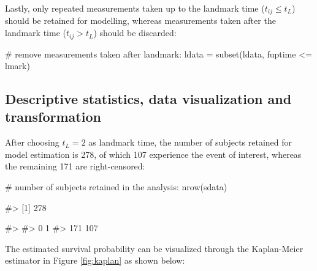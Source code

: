 Lastly, only repeated measurements taken up to the landmark time
(\(t_{ij} \leq t_L\)) should be retained for modelling, whereas
measurements taken after the landmark time (\(t_{ij} > t_L\)) should be
discarded:

\begin{Schunk}
\begin{Sinput}
# remove measurements taken after landmark:
ldata = subset(ldata, fuptime <= lmark)
\end{Sinput}
\end{Schunk}

\subsection{Descriptive statistics, data visualization and
transformation}\label{descriptive-statistics-data-visualization-and-transformation}

After choosing \(t_L = 2\) as landmark time, the number of subjects
retained for model estimation is 278, of which 107 experience the event
of interest, whereas the remaining 171 are right-censored:

\begin{Schunk}
\begin{Sinput}
# number of subjects retained in the analysis:
nrow(sdata)
\end{Sinput}
\begin{Soutput}
#> [1] 278
\end{Soutput}
\begin{Soutput}
#> 
#>   0   1 
#> 171 107
\end{Soutput}
\end{Schunk}

The estimated survival probability can be visualized through the
Kaplan-Meier estimator in Figure \ref{fig:kaplan} as shown below:

